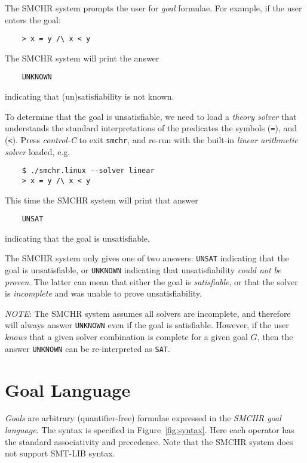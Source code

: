 \documentclass{article}
\begin{document}
The SMCHR system prompts the user for \emph{goal} formulae.
For example, if the user enters the goal:
\begin{verbatim}
    > x = y /\ x < y
\end{verbatim}
The SMCHR system will print the answer
\begin{verbatim}
    UNKNOWN
\end{verbatim}
indicating that (un)satisfiability is not known.

To determine that the goal is unsatisfiable, we need to load a
\emph{theory solver} that understands the standard interpretations of
the predicates the symbols (\texttt{=}), and (\texttt{<}).
Press \emph{control-C} to exit \texttt{smchr},
and re-run with the built-in \emph{linear arithmetic solver} loaded, e.g.
\begin{verbatim}
    $ ./smchr.linux --solver linear
    > x = y /\ x < y
\end{verbatim}
This time the SMCHR system will print that answer
\begin{verbatim}
    UNSAT
\end{verbatim}
indicating that the goal is unsatisfiable.

The SMCHR system only gives one of two answers:
\texttt{UNSAT} indicating that the goal is unsatisfiable, or
\texttt{UNKNOWN} indicating that unsatisfiability \emph{could not be proven}.
The latter can mean that either the goal is \emph{satisfiable}, or
that the solver is \emph{incomplete} and was unable to prove unsatisfiability.

\noindent \emph{NOTE}:
The SMCHR system assumes all solvers are incomplete, and therefore
will always answer \texttt{UNKNOWN} even if the goal is satisfiable.
However, if the user \emph{knows} that a given solver combination is
complete for a given goal $G$, then the answer \texttt{UNKNOWN} can
be re-interpreted as \texttt{SAT}.

\section{Goal Language}

\emph{Goals} are arbitrary (quantifier-free) formulae expressed in the
\emph{SMCHR goal language}.
The syntax is specified in Figure~\ref{fig:syntax}.
Here each operator has the standard associativity and precedence.
Note that the SMCHR system does not support SMT-LIB syntax.
\end{document}
